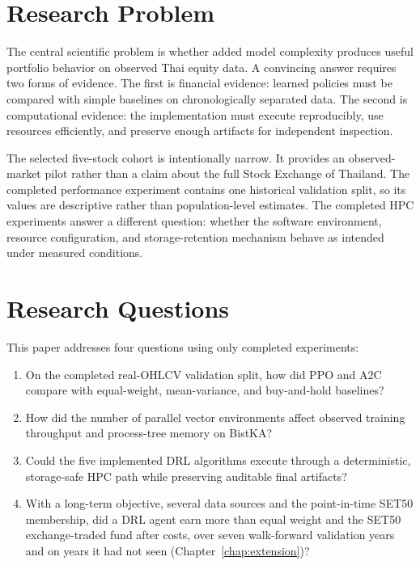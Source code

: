 \documentclass[12pt,a4paper,oneside]{book}
\begin{document}
\section{Research Problem}

The central scientific problem is whether added model complexity produces useful portfolio behavior on observed Thai equity data. A convincing answer requires two forms of evidence. The first is financial evidence: learned policies must be compared with simple baselines on chronologically separated data. The second is computational evidence: the implementation must execute reproducibly, use resources efficiently, and preserve enough artifacts for independent inspection.

The selected five-stock cohort is intentionally narrow. It provides an observed-market pilot rather than a claim about the full Stock Exchange of Thailand. The completed performance experiment contains one historical validation split, so its values are descriptive rather than population-level estimates. The completed HPC experiments answer a different question: whether the software environment, resource configuration, and storage-retention mechanism behave as intended under measured conditions.

\section{Research Questions}

This paper addresses four questions using only completed experiments:
\begin{enumerate}
  \item On the completed real-OHLCV validation split, how did PPO and A2C compare with equal-weight, mean-variance, and buy-and-hold baselines?
  \item How did the number of parallel vector environments affect observed training throughput and process-tree memory on BistKA?
  \item Could the five implemented DRL algorithms execute through a deterministic, storage-safe HPC path while preserving auditable final artifacts?
  \item With a long-term objective, several data sources and the point-in-time SET50 membership, did a DRL agent earn more than equal weight and the SET50 exchange-traded fund after costs, over seven walk-forward validation years and on years it had not seen (Chapter~\ref{chap:extension})?
\end{enumerate}
\end{document}
